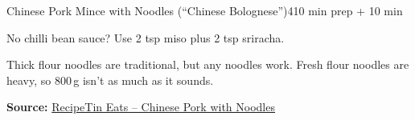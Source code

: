 \begin{recipebox}{Chinese Pork Mince with Noodles (``Chinese Bolognese'')}{4}{10 min prep + 10 min}
\begin{notelist}
  \item No chilli bean sauce? Use 2 tsp miso plus 2 tsp sriracha.
  \item Thick flour noodles are traditional, but any noodles work. Fresh flour
        noodles are heavy, so 800\,g isn't as much as it sounds.
\end{notelist}

\noindent\textbf{Source:} \href{https://www.recipetineats.com/chinese-pork-mince-with-noodles/}{RecipeTin Eats -- Chinese Pork with Noodles}

\end{recipebox}
